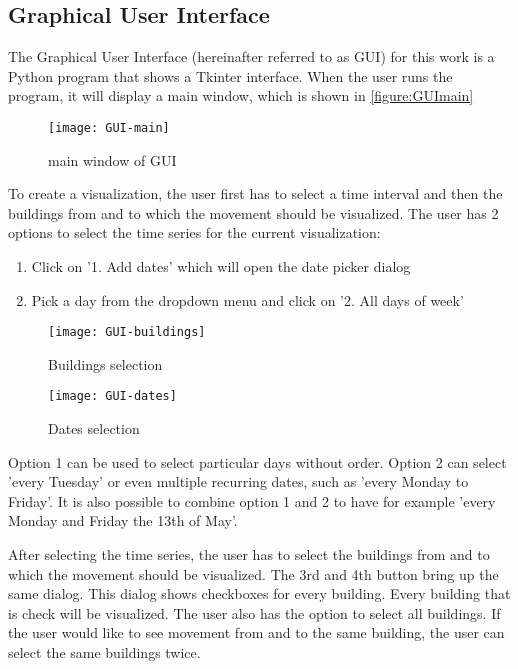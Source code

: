 \subsection{Graphical User Interface}\label{GUI}
The Graphical User Interface (hereinafter referred to as GUI) for this work is a Python program that shows a Tkinter interface. When the user runs the program, it will display a main window, which is shown in \autoref{figure:GUImain}
\begin{figure}[H]
\centering
\texttt{[image: GUI-main]}
\captionsetup{justification=centering}
\caption{main window of GUI}
\label{figure:GUImain}
\end{figure}
\pagebreak 
To create a visualization, the user first has to select a time interval and then the buildings from and to which the movement should be visualized. The user has 2 options to select the time series for the current visualization:
\begin{enumerate}
\item Click on '1. Add dates' which will open the date picker dialog
\item Pick a day from the dropdown menu and click on '2. All days of week' 
\end{enumerate}

\begin{figure}[H]
\centering
\texttt{[image: GUI-buildings]}
\captionsetup{justification=centering}
\caption{Buildings selection}
\label{figure:GUIbuildings}
\end{figure}

\begin{figure}[H]
\centering
\texttt{[image: GUI-dates]}
\captionsetup{justification=centering}
\caption{Dates selection}
\label{figure:GUIdates}
\end{figure}

Option 1 can be used to select particular days without order. Option 2 can select 'every Tuesday' or even multiple recurring dates, such as 'every Monday to Friday'. It is also possible to combine option 1 and 2 to have for example 'every Monday and Friday the 13th of May'. 

After selecting the time series, the user has to select the buildings from and to which the movement should be visualized. The 3rd and 4th button bring up the same dialog. This dialog shows checkboxes for every building. Every building that is check will be visualized. The user also has the option to select all buildings. If the user would like to see movement from and to the same building, the user can select the same buildings twice.

